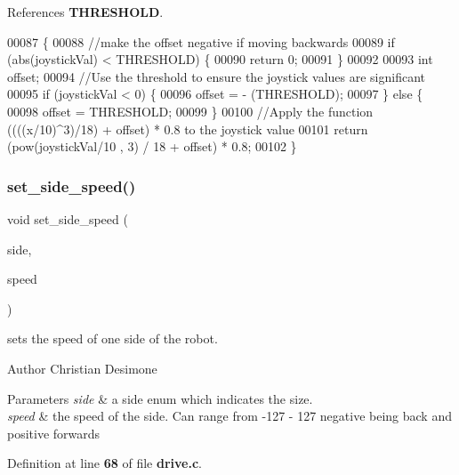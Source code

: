 References \textbf{ T\+H\+R\+E\+S\+H\+O\+LD}.


\begin{DoxyCode}
00087                                           \{
00088     \textcolor{comment}{//make the offset negative if moving backwards}
00089     \textcolor{keywordflow}{if} (abs(joystickVal) < THRESHOLD) \{
00090             \textcolor{keywordflow}{return} 0;
00091     \}
00092 
00093     \textcolor{keywordtype}{int} offset;
00094   \textcolor{comment}{//Use the threshold to ensure the joystick values are significant}
00095     \textcolor{keywordflow}{if} (joystickVal < 0) \{
00096         offset = - (THRESHOLD);
00097     \} \textcolor{keywordflow}{else} \{
00098         offset = THRESHOLD;
00099     \}
00100   \textcolor{comment}{//Apply the function ((((x/10)^3)/18) + offset) * 0.8 to the joystick value}
00101     \textcolor{keywordflow}{return} (pow(joystickVal/10 , 3) / 18 + offset) * 0.8;
00102 \}
\end{DoxyCode}
\mbox{\label{drive_8c_a8df41fd50094c065eedc81fc5e6595d1}} 
\subsubsection{set\+\_\+side\+\_\+speed()}
{\footnotesize\ttfamily void set\+\_\+side\+\_\+speed (\begin{DoxyParamCaption}\item[{\textbf{ side\+\_\+t}}]{side,  }\item[{int}]{speed }\end{DoxyParamCaption})}



sets the speed of one side of the robot. 

\begin{DoxyAuthor}{Author}
Christian Desimone 
\end{DoxyAuthor}

\begin{DoxyParams}{Parameters}
{\em side} & a side enum which indicates the size. \\
\hline
{\em speed} & the speed of the side. Can range from -\/127 -\/ 127 negative being back and positive forwards \\
\hline
\end{DoxyParams}


Definition at line \textbf{ 68} of file \textbf{ drive.\+c}.



